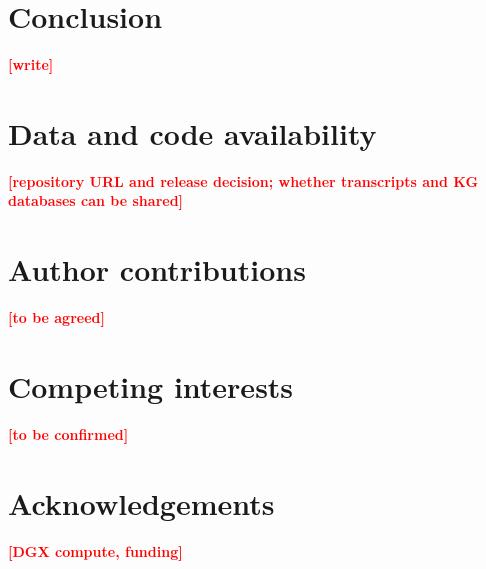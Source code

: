 \documentclass[11pt,a4paper]{article}
\newcommand{\pending}[1]{\textcolor{red}{\textbf{[#1]}}}   %
\begin{document}
\section{Conclusion}\label{sec:conclusion}
\pending{write}

\section*{Data and code availability}
\pending{repository URL and release decision; whether transcripts and KG databases can be shared}

\section*{Author contributions}
\pending{to be agreed}

\section*{Competing interests}
\pending{to be confirmed}

\section*{Acknowledgements}
\pending{DGX compute, funding}

\nocite{*}


\end{document}
